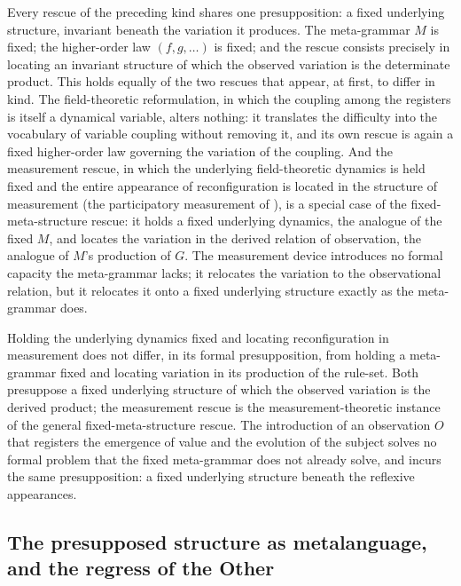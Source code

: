 Every rescue of the preceding kind shares one presupposition: a fixed underlying structure, invariant beneath the variation it produces. The meta-grammar $M$ is fixed; the higher-order law $(f, g, \dots)$ is fixed; and the rescue consists precisely in locating an invariant structure of which the observed variation is the determinate product. This holds equally of the two rescues that appear, at first, to differ in kind. The field-theoretic reformulation, in which the coupling among the registers is itself a dynamical variable, alters nothing: it translates the difficulty into the vocabulary of variable coupling without removing it, and its own rescue is again a fixed higher-order law governing the variation of the coupling. And the measurement rescue, in which the underlying field-theoretic dynamics is held fixed and the entire appearance of reconfiguration is located in the structure of measurement (the participatory measurement of ), is a special case of the fixed-meta-structure rescue: it holds a fixed underlying dynamics, the analogue of the fixed $M$, and locates the variation in the derived relation of observation, the analogue of $M$'s production of $G$. The measurement device introduces no formal capacity the meta-grammar lacks; it relocates the variation to the observational relation, but it relocates it onto a fixed underlying structure exactly as the meta-grammar does.

\begin{claim}
Holding the underlying dynamics fixed and locating reconfiguration in measurement does not differ, in its formal presupposition, from holding a meta-grammar fixed and locating variation in its production of the rule-set. Both presuppose a fixed underlying structure of which the observed variation is the derived product; the measurement rescue is the measurement-theoretic instance of the general fixed-meta-structure rescue. The introduction of an observation $O$ that registers the emergence of value and the evolution of the subject solves no formal problem that the fixed meta-grammar does not already solve, and incurs the same presupposition: a fixed underlying structure beneath the reflexive appearances.
\end{claim}

\subsection{The presupposed structure as metalanguage, and the regress of the Other}
\label{p10:sec:mod-metalanguage}

